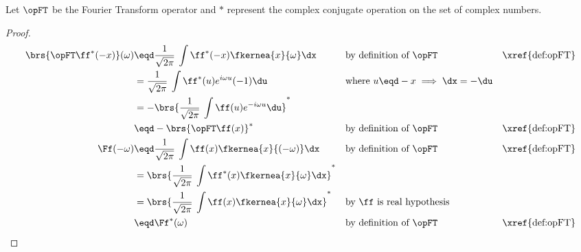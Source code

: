 \begin{theorem}
\label{thm:ft_conj}
\label{thm:ft_neg}
Let $\opFT$ be the Fourier Transform operator and $\ast$ represent the complex conjugate operation on the set of 
complex numbers.
\end{theorem}
\begin{proof}
\begin{align*}
  \brs{\opFT\ff^\ast(-x)}(\omega)
     &\eqd \frac{1}{\sqrt{2\pi}}\:\int \ff^\ast(-x) \fkernea{x}{\omega}\dx
     &&    \text{by definition of $\opFT$}
     &&    \text{\xref{def:opFT}}
   \\&=    \frac{1}{\sqrt{2\pi}}\:\int \ff^\ast(u) e^{i\omega u}(-1)\du
     &&    \text{where $u\eqd-x\implies\dx=-\du$}
   \\&=    -\brs{\frac{1}{\sqrt{2\pi}}\:\int \ff(u) e^{-i\omega u}\du}^\ast
   \\&\eqd -\brs{\opFT\ff(x)}^\ast
     &&    \text{by definition of $\opFT$}
     &&    \text{\xref{def:opFT}}
   \\
   \Ff(-\omega)
     &\eqd \frac{1}{\sqrt{2\pi}}\:\int \ff(x) \fkernea{x}{(-\omega)}\dx
     &&    \text{by definition of $\opFT$}
     &&    \text{\xref{def:opFT}}
   \\&=    \brs{\frac{1}{\sqrt{2\pi}}\:\int \ff^\ast(x) \fkernea{x}{\omega}\dx}^\ast
   \\&=    \brs{\frac{1}{\sqrt{2\pi}}\:\int \ff     (x) \fkernea{x}{\omega}\dx}^\ast
     &&    \text{by $\ff$ is real hypothesis}
   \\&\eqd \Ff^\ast(\omega)
     &&    \text{by definition of $\opFT$}
     &&    \text{\xref{def:opFT}}
\end{align*}
\end{proof}




